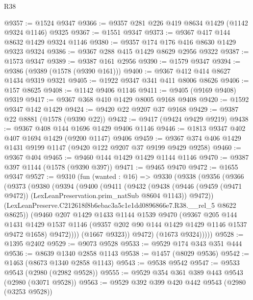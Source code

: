 \begin{lexlean}{R38}
\begin{coremodule}
@9357 := @1524 @9347
@9366 := @9357 @281 @226 @419 @8634 @1429 (@1142 @9324 @1146) @9325
@9367 := @1551 @9347
@9373 := @9367 @417 @144 @8632 @1429 @9324 @1146
@9380 := @9357 @174 @176 @416 @8630 @1429 @9323 @9324
@9386 := @9367 @288 @415 @1429 @8629 @2956 @9322
@9387 := @1573 @9347
@9389 := @9387 @161 @2956
@9390 := @1579 @9347
@9394 := @9386 (@9389 (@1578 (@9390 @161)))
@9400 := @9367 @412 @414 @8627 @1434 @9319 @9321
@9405 := @1922 @9347 @341 @411 @8006 @8626
@9406 := @157 @8625
@9408 := @1142 @9406 @1146
@9411 := @9405 (@9169 @9408) @9319
@9417 := @9367 @368 @410 @1429 @8005 @9168 @9408
@9420 := @1592 @9347 @142 @1429
@9424 := @9420 @22 @9207 @37 @9168
@9429 := @9387 @22 @8881 (@1578 (@9390 @22))
@9432 := @9417 (@9424 @9429 @9219)
@9438 := @9367 @408 @144 @1696 @1429 @9406 @1146
@9446 := @1813 @9347 @402 @407 @1694 @1429 (@9200 @1147) @9406
@9459 := @9367 @374 @406 @1429 @1431 @9199 @1147 (@9420 @122 @9207 @37 @9199 @9429 @9258)
@9460 := @9367 @404
@9465 := @9460 @144 @1429 @1429 @1144 @1146
@9470 := @9387 @397 @1144 (@1578 (@9390 @397))
@9471 := @9465 @9470
@9472 := @1655 @9347
@9527 := @9310
    (fun (wanted : @16) =>
    @9330
      (@9338
        (@9356
          (@9366
            (@9373
              (@9380
                (@9394
                  (@9400
                    (@9411
                      (@9432
                        (@9438
                          (@9446
                            (@9459 (@9471 @9472))
                            (LexLeanPreservation.prim_natSub @8604 @1143))
                          @9472))
                      (LexLeanPreserve.C212618f8b6ebac3a5c1e1dd0896866e7.R38.__rel_5 @8622 @8625))
                    (@9460
                      @207
                      @1429
                      @1433
                      @1144
                      @1539
                      @9470
                      (@9367
                        @205
                        @144
                        @1431
                        @1429
                        @1537
                        @1146
                        (@9357 @202 @90 @144 @1429 @1429 @1146 @1537 @9472 @1658)
                        @9472))))
                (@1667 @9323))
              @9472)
            (@1673 @9324)))))
@9528 := @1395 @2402
@9529 := @9073 @9528
@9533 := @9529 @174 @343 @351 @444
@9536 := @8639 @1340 @2858 @1143
@9538 := @1457 (@8029 @9536)
@9542 := @1463 (@8673 @1340 @2858 @1143)
@9543 := @9538 @9542
@9547 := @9533 @9543 (@2980 (@2982 @9528))
@9555 := @9529 @354 @361 @389 @443 @9543 (@2980 (@3071 @9528))
@9563 := @9529 @392 @399 @420 @442 @9543 (@2980 (@3253 @9528))

\end{coremodule}
\end{lexlean}
